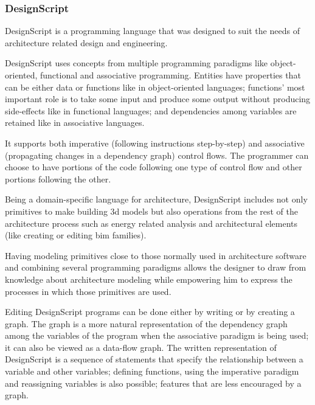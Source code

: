 \documentclass{./llncs2e/llncs}
\begin{document}
\subsubsection{DesignScript\cite{aish2012designscript}}
	DesignScript is a programming language that was designed to suit the needs of architecture related design and engineering.
	
	DesignScript uses concepts from multiple programming paradigms like object-oriented, functional and associative programming. 
	Entities have properties that can be either data or functions like in object-oriented languages; functions' most important role is to take some input and produce some output without producing side-effects like in functional languages; and dependencies among variables are retained like in associative languages.
	
	It supports both imperative (following instructions step-by-step) and associative (propagating changes in a dependency graph) control flows. 
	The programmer can choose to have portions of the code following one type of control flow and other portions following the other.
	
	Being a domain-specific language for architecture, DesignScript includes not only primitives to make building 3d models but also operations from the rest of the architecture process such as energy related analysis and architectural elements (like creating or editing \ac{bim} families).
	
	Having modeling primitives close to those normally used in architecture software and combining several programming paradigms allows the designer to draw from knowledge about architecture modeling while empowering him to express the processes in which those primitives are used.
	
	Editing DesignScript programs can be done either by writing or by creating a graph. 
	The graph is a more natural representation of the dependency graph among the variables of the program when the associative paradigm is being used; it can also be viewed as a data-flow graph. 
	The written representation of DesignScript is a sequence of statements that specify the relationship between a variable and other variables; defining functions, using the imperative paradigm and reassigning variables is also possible; features that are less encouraged by a graph.
	
\end{document}
